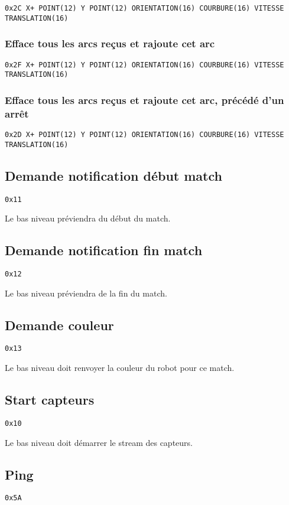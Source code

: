\documentclass[a4paper, 12pt]{article}
\begin{document}
    \texttt{0x2C X+ POINT(12) Y POINT(12) ORIENTATION(16) COURBURE(16) VITESSE TRANSLATION(16)}

\subsubsection{Efface tous les arcs reçus et rajoute cet arc}

    \texttt{0x2F X+ POINT(12) Y POINT(12) ORIENTATION(16) COURBURE(16) VITESSE TRANSLATION(16)}
    
\subsubsection{Efface tous les arcs reçus et rajoute cet arc, précédé d'un arrêt} 

\texttt{0x2D X+ POINT(12) Y POINT(12) ORIENTATION(16) COURBURE(16) VITESSE TRANSLATION(16)}
   
\subsection{Demande notification début match}
    \texttt{0x11}

Le bas niveau préviendra du début du match.
   
   \subsection{Demande notification fin match}
       \texttt{0x12}
   
   Le bas niveau préviendra de la fin du match.
   
\subsection{Demande couleur}
    \texttt{0x13}

Le bas niveau doit renvoyer la couleur du robot pour ce match.

    
\subsection{Start capteurs}
\texttt{0x10}
    
Le bas niveau doit démarrer le stream des capteurs.
    
\subsection{Ping}
    \texttt{0x5A}
    
\end{document}
